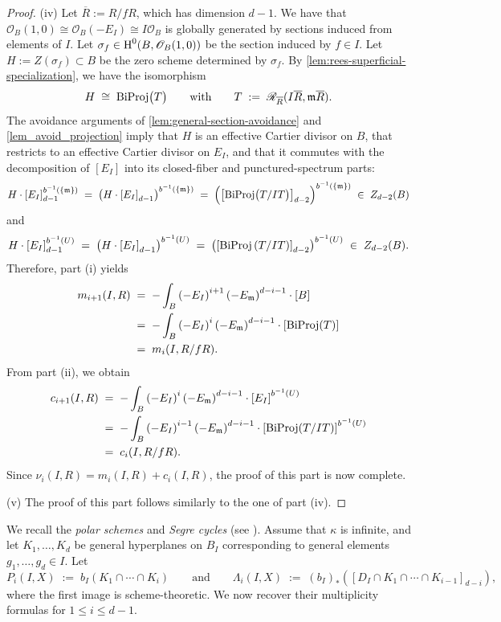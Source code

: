 \documentclass[a4paper, 11pt]{amsart}
\newcommand{\mm}{{\normalfont\mathfrak{m}}}
\newcommand{\Rees}{\mathscr{R}}
\newcommand{\OO}{\mathscr{O}}
\newcommand{\HH}{\normalfont\text{H}}
\newcommand{\biProj}{{\normalfont\text{BiProj}}}
\theoremstyle{definition}
\begin{document}
\begin{proof}
		
		(iv) Let $\overline R:=R/fR$, which has dimension $d-1$.
		We have that $\OO_B(1,0)\cong \OO_B(-E_I) \cong I \OO_B$ is globally generated by sections induced from elements of $I$.
		Let $\sigma_f \in \HH^0(B, \OO_B(1,0))$ be the section induced by $f \in I$.
		Let $H := Z(\sigma_f)\subset B$ be the zero scheme determined by $\sigma_f$.
		By \autoref{lem:rees-superficial-specialization}, we have the isomorphism
		$$
		H \;\cong\; \biProj\big(T\big) \qquad \text{with} \qquad T \;:=\; \Rees_{\overline R}(I\overline R,\mm\overline R).
		$$
		The avoidance arguments of \autoref{lem:general-section-avoidance} and \autoref{lem_avoid_projection} imply that $H$ is an effective Cartier divisor on $B$,  that restricts to an effective Cartier divisor on $E_I$, and that it commutes with the decomposition of $[E_I]$ into its closed-fiber and punctured-spectrum parts:
		$$
		H \cdot \left[E_I\right]_{d-1}^{b^{-1}(\{\mm\})} \;=\; \left(H \cdot \left[E_I\right]_{d-1}\right)^{b^{-1}(\{\mm\})} \;=\;  \left(\left[\biProj\big(T/IT\big)\right]_{d-2}\right)^{b^{-1}(\{\mm\})} \;\in\; Z_{d-2}(B)
		$$
		and
		$$
		H \cdot \left[E_I\right]_{d-1}^{b^{-1}(U)} \;=\; \left(H \cdot \left[E_I\right]_{d-1}\right)^{b^{-1}(U)} \;=\;  \left(\left[\biProj\left(T/IT\right)\right]_{d-2}\right)^{b^{-1}(U)} \;\in\; Z_{d-2}(B).
		$$
		Therefore, part (i) yields 
		\begin{align*}
			m_{i+1}(I,R)
			\;&=\;
			-\int_B \left(-E_I\right)^{i+1} \left(-E_\mm\right)^{d-i-1} \cdot \left[B\right]\\
			\;&=\;
			-\int_B \left(-E_I\right)^{i} \left(-E_\mm\right)^{d-i-1} \cdot \left[\biProj(T)\right]\\
			\;&=\; m_i(I, R/fR).
		\end{align*}
		From part (ii), we obtain 
		\begin{align*}
			c_{i+1}(I,R)
			&\;=\;
			-\int_B \left(-E_I\right)^{i} \left(-E_\mm\right)^{d-i-1} \cdot \left[E_I\right]^{b^{-1}(U)} \\
			&\;=\;
			-\int_B \left(-E_I\right)^{i-1} \left(-E_\mm\right)^{d-i-1} \cdot \left[\biProj(T/IT)\right]^{b^{-1}(U)} \\
			&\;=\; c_i(I, R/fR).
		\end{align*}
		Since $\nu_i(I, R) = m_i(I, R) + c_i(I, R)$, the proof of this part is now complete. 
		
		(v) The proof of this part follows similarly to the one of part (iv).
	\end{proof}
	
	We recall the \emph{polar schemes} and \emph{Segre cycles} (see \cite{GG, CRPU}).
	Assume that $\kappa$ is infinite, and let $K_1,\ldots,K_d$ be general hyperplanes on $B_I$ corresponding to general elements $g_1,\ldots,g_d\in I$.
	Let
	$$
	P_i(I,X) \;:=\; b_I\left(K_1\cap\cdots\cap K_i\right)
	\qquad
	\text{and}
	\qquad
	\Lambda_i(I,X) \;:=\; (b_I)_*\left(\left[D_I \cap K_1\cap\cdots\cap K_{i-1}\right]_{d-i}\right),
	$$
	where the first image is scheme-theoretic.
	We now recover their multiplicity formulas for $1\leq i\leq d-1$.
	
\end{document}
